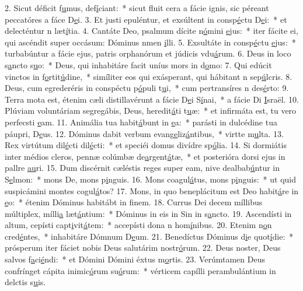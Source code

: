 2. Sicut déficit f\uline{u}mus, def\uline{í}ciant:~* sicut fluit cera a fácie ignis, sic péreant peccatóres a fáce D\uline{e}i.
3. Et justi epuléntur, et exsúltent in consp\uline{é}ctu D\uline{e}i:~* et delecténtur n læt\uline{í}tia.
4. Cantáte Deo, psalmum dícite n\uline{ó}mini \uline{e}jus:~* iter fácite ei, qui ascéndit super occásum: Dóminus nmen \uline{i}lli.
5. Exsultáte in consp\uline{é}ctu \uline{e}jus:~* turbabúntur a fácie ejus, patris orphanórum et júdicis vdu\uline{á}rum.
6. Deus in loco s\uline{a}ncto s\uline{u}o:~* Deus, qui inhabitáre facit uníus mors in d\uline{o}mo:
7. Qui edúcit vinctos in f\uline{o}rtit\uline{ú}dine,~* simíliter eos qui exásperant, qui hábitant n sep\uline{ú}lcris.
8. Deus, cum egrederéris in conspéctu p\uline{ó}puli t\uline{u}i,~* cum pertransíres n des\uline{é}rto:
9. Terra mota est, étenim cæli distillavérunt a fácie D\uline{e}i S\uline{í}nai,~* a fácie Di \uline{I}sraël.
10. Plúviam voluntáriam segregábis, Deus, heredit\uline{á}ti t\uline{u}æ:~* et infirmáta est, tu vero perfecsti \uline{e}am.
11. Animália tua habit\uline{á}bunt in \uline{e}a:~* parásti in dulcédine tua páupri, D\uline{e}us.
12. Dóminus dabit verbum evang\uline{e}liz\uline{á}ntibus,~* virtte m\uline{u}lta.
13. Rex virtútum dil\uline{é}cti dil\uline{é}cti:~* et speciéi domus divídre sp\uline{ó}lia.
14. Si dormiátis inter médios cleros, pennæ colúmbæ de\uline{a}rgent\uline{á}tæ,~* et posterióra dorsi ejus in pallre \uline{au}ri.
15. Dum discérnit cæléstis reges super eam, nive dealbab\uline{ú}ntur in S\uline{e}lmon:~* mons De, mons p\uline{i}nguis.
16. Mons coagul\uline{á}tus, mons p\uline{i}nguis:~* ut quid suspicámini montes cogul\uline{á}tos?
17. Mons, in quo beneplácitum est Deo habit\uline{á}re in \uline{e}o:~* étenim Dóminus habitábt in f\uline{i}nem.
18. Currus Dei decem míllibus múltiplex, mílli\uline{a} læt\uline{á}ntium:~* Dóminus in eis in Sin in s\uline{a}ncto.
19. Ascendísti in altum, cepísti capt\uline{i}vit\uline{á}tem:~* accepísti dona n hom\uline{í}nibus.
20. Etenim n\uline{o}n cred\uline{é}ntes,~* inhabitáre Dómnum D\uline{e}um.
21. Benedíctus Dóminus d\uline{i}e quot\uline{í}die:~* prósperum iter fáciet nobis Deus salutárim nostr\uline{ó}rum.
22. Deus noster, Deus salvos f\uline{a}ci\uline{é}ndi:~* et Dómini Dómini éxtus m\uline{o}rtis.
23. Verúmtamen Deus confrínget cápita inimic\uline{ó}rum su\uline{ó}rum:~* vérticem capílli perambulántium in delctis s\uline{u}is.
